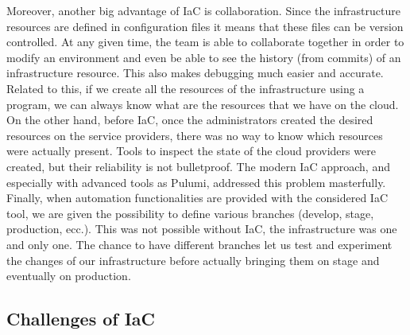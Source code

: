 Moreover, another big advantage of IaC is collaboration.
Since the infrastructure resources are defined in configuration files it means that these files can be version controlled.
At any given time, the team is able to collaborate together in order to modify an environment and even be able to see the history (from commits) of an infrastructure resource.
This also makes debugging much easier and accurate.\\
Related to this, if we create all the resources of the infrastructure using a program, we can always know what are the resources that we have on the cloud.
On the other hand, before IaC, once the administrators created the desired resources on the service providers, there was no way to know which resources were actually present.
Tools to inspect the state of the cloud providers were created, but their reliability is not bulletproof.
The modern IaC approach, and especially with advanced tools as Pulumi, addressed this problem masterfully.\\
Finally, when automation functionalities are provided with the considered IaC tool, we are given the possibility to define various branches (develop, stage, production, ecc.).
This was not possible without IaC, the infrastructure was one and only one.
The chance to have different branches let us test and experiment the changes of our infrastructure before actually bringing them on stage and eventually on production.\\



\subsection{Challenges of IaC}

